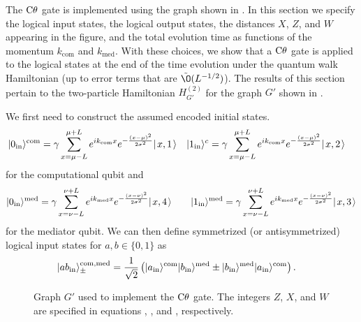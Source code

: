 \documentclass[../thesis-main/thesis-main]{subfiles}
\begin{document}
The $\mathrm{C}\theta$ gate is implemented using the graph shown in . In this section we specify the logical input states, the logical output states, the distances $X$, $Z$, and $W$ appearing in the figure, and the total evolution time as functions of the momentum $k_{\text{com}}$ and $k_{\text{med}}$. With these choices, we show that a $\mathrm{C}\theta$ gate is applied to the logical states at the end of the time evolution under the quantum walk Hamiltonian (up to error terms that are $\tilde{\O}(L^{-{1}/{2}})$). The results of this section pertain to the two-particle Hamiltonian $H^{(2)}_{G'}$ for the graph $G'$ shown in .

We first need to construct the assumed encoded initial states.  
\begin{align}
|0_{\text{in}}\rangle^{\text{com}}&=  \gamma \sum_{x = \mu -L} ^{\mu + L}  e^{i k_{\text{com}} x} e^{- \frac{(x-\mu)^2}{2\sigma^2}} |\mspace{2mu} x,1 \mspace{2mu} \rangle & |1_\text{in}\rangle^c&= \gamma \sum_{x = \mu -L} ^{\mu + L}  e^{i k_{\text{com}} x} e^{- \frac{(x-\mu)^2}{2\sigma^2}} |\mspace{2mu} x,2 \mspace{2mu} \rangle 
\end{align}
for the computational qubit and
\begin{equation*}
|0_{\text{in}}\rangle^{\text{med}}=\gamma \sum_{x = \nu -L} ^{\nu + L}  e^{i k_{\text{med}} x} e^{- \frac{(x-\nu)^2}{2\sigma^2}} |\mspace{2mu} x,4 \mspace{2mu} \rangle \qquad |1_\text{in}\rangle^{\text{med}}=\gamma \sum_{x = \nu -L} ^{\nu + L}  e^{i k_{\text{med}} x} e^{- \frac{(x-\nu)^2}{2\sigma^2}} |\mspace{2mu} x,3 \mspace{2mu} \rangle 
\end{equation*}
 for the mediator qubit. We can then define symmetrized (or antisymmetrized) logical input states for $a,b\in\{0,1\}$ as
\begin{align*}
|a b_{\text{in}}\rangle^{\text{com},\text{med}}_\pm &=\frac{1}{\sqrt{2}} \left(|a_{\text{in}}\rangle^{\text{com}} |b_{\text{in}}\rangle^{\text{med}} \pm |b_{\text{in}}\rangle^{\text{med}}|a_{\text{in}}\rangle^{\text{com}}\right).
\end{align*}

\begin{figure}
  \centering
   
  \caption{Graph $G'$ used to implement the $\mathrm{C}\theta$ gate. The integers $Z$, $X$, and $W$ are specified in equations , , and , respectively.}
\label{fig:explicit_cd}
\end{figure}
\end{document}
